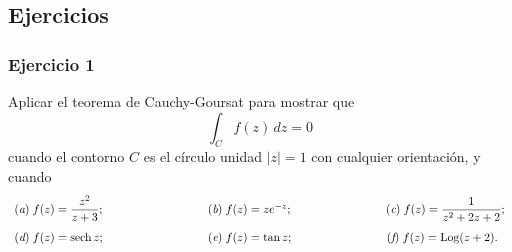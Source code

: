 \documentclass[a4paper]{report}
\DeclareMathOperator{\Log}{Log}
\DeclareMathOperator{\sech}{sech}
\begin{document}
\subsection*{Ejercicios}

\subsubsection*{Ejercicio 1}

Aplicar el teorema de Cauchy-Goursat para mostrar que 
\[
 \int_Cf(z)\,dz=0
\]
cuando el contorno \(C\) es el círculo unidad \(|z|=1\) con cualquier orientación, y cuando
\[
 \begin{array}{lll}
  (\textit{a})\;f(z)=\dfrac{z^2}{z+3};\qquad\qquad\qquad\qquad&(\textit{b})\;f(z)=ze^{-z};\qquad\qquad\qquad\qquad
  (\textit{c})\;f(z)=\dfrac{1}{z^2+2z+2};\\[\bigskipamount]
  (\textit{d})\;f(z)=\sech z;\qquad\qquad\qquad\qquad&(\textit{e})\;f(z)=\tan z;\qquad\qquad\qquad\qquad
  (\textit{f})\;f(z)=\Log(z+2).
 \end{array}
\]
\end{document}

